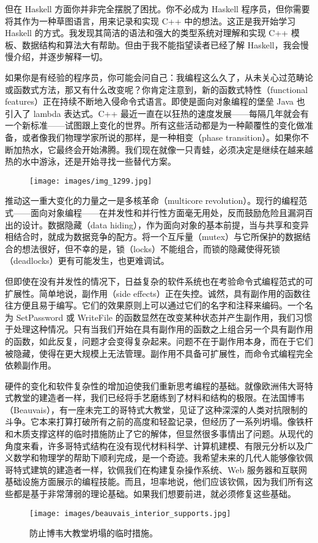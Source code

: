 但在 Haskell 方面你并非完全摆脱了困扰。你不必成为 Haskell 程序员，但你需要将其作为一种草图语言，用来记录和实现 C++ 中的想法。这正是我开始学习 Haskell 的方式。我发现其简洁的语法和强大的类型系统对理解和实现 C++ 模板、数据结构和算法大有帮助。但由于我不能指望读者已经了解 Haskell，我会慢慢介绍，并逐步解释一切。

如果你是有经验的程序员，你可能会问自己：我编程这么久了，从未关心过范畴论或函数式方法，那又有什么改变呢？你肯定注意到，新的函数式特性（functional features）正在持续不断地入侵命令式语言。即使是面向对象编程的堡垒 Java 也引入了 lambda 表达式。C++ 最近一直在以狂热的速度发展——每隔几年就会有一个新标准——试图跟上变化的世界。所有这些活动都是为一种颠覆性的变化做准备，或者像我们物理学家所说的那样，是一种相变（phase transition）。如果你不断加热水，它最终会开始沸腾。我们现在就像一只青蛙，必须决定是继续在越来越热的水中游泳，还是开始寻找一些替代方案。

\begin{figure}[H]
  \centering
  \texttt{[image: images/img\_1299.jpg]}
\end{figure}

\noindent
推动这一重大变化的力量之一是多核革命（multicore revolution）。现行的编程范式——面向对象编程——在并发性和并行性方面毫无用处，反而鼓励危险且漏洞百出的设计。数据隐藏（data hiding），作为面向对象的基本前提，当与共享和变异相结合时，就成为数据竞争的配方。将一个互斥量（mutex）与它所保护的数据结合的想法很好，但不幸的是，锁（locks）不能组合，而锁的隐藏使得死锁（deadlocks）更有可能发生，也更难调试。

但即使在没有并发性的情况下，日益复杂的软件系统也在考验命令式编程范式的可扩展性。简单地说，副作用（side effects）正在失控。诚然，具有副作用的函数往往方便且易于编写。它们的效果原则上可以通过它们的名字和注释来编码。一个名为 SetPassword 或 WriteFile 的函数显然在改变某种状态并产生副作用，我们习惯于处理这种情况。只有当我们开始在具有副作用的函数之上组合另一个具有副作用的函数，如此反复，问题才会变得复杂起来。问题不在于副作用本身，而在于它们被隐藏，使得在更大规模上无法管理。副作用不具备可扩展性，而命令式编程完全依赖副作用。

硬件的变化和软件复杂性的增加迫使我们重新思考编程的基础。就像欧洲伟大哥特式教堂的建造者一样，我们已经将手艺磨练到了材料和结构的极限。在法国博韦（Beauvais），有一座未完工的哥特式大教堂，见证了这种深深的人类对抗限制的斗争。它本来打算打破所有之前的高度和轻盈记录，但经历了一系列坍塌。像铁杆和木质支撑这样的临时措施防止了它的解体，但显然很多事情出了问题。从现代的角度来看，许多哥特式结构在没有现代材料科学、计算机建模、有限元分析以及广义数学和物理学的帮助下顺利完成，是一个奇迹。我希望未来的几代人能够像钦佩哥特式建筑的建造者一样，钦佩我们在构建复杂操作系统、Web 服务器和互联网基础设施方面展示的编程技能。而且，坦率地说，他们应该钦佩，因为我们所有这些都是基于非常薄弱的理论基础。如果我们想要前进，就必须修复这些基础。

\begin{figure}
  \centering
  \texttt{[image: images/beauvais\_interior\_supports.jpg]}
  \caption{防止博韦大教堂坍塌的临时措施。}
\end{figure}
